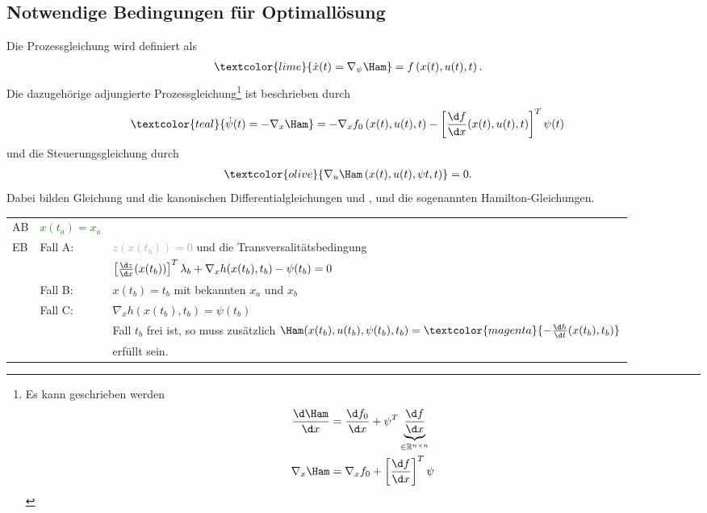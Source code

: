\subsection{Notwendige Bedingungen für Optimallösung}
Die Prozessgleichung wird definiert als
\begin{align}
	\textcolor{lime}{\dot{x}(t) = \nabla_{\psi}\Ham} & = f\left(x(t),u(t),t \right). \label{eqn:kap_2_prozessgleichung}
\end{align}
Die dazugehörige adjungierte Prozessgleichung\footnote{Es kann geschrieben werden \begin{align*}
\frac{\d\Ham}{\d x} & = \frac{\d f_0}{\d x}+\psi^T\underbrace{\frac{\d f}{\d x}}_{\in\mathbb{R}^{n\times n}}\\
\nabla_x\Ham & = \nabla_x f_0+\left[\frac{\d f}{\d x} \right]^T\psi
\end{align*}} ist beschrieben durch
\begin{align}
	\textcolor{teal}{\dot{\psi}(t) = -\nabla_x\Ham } & = -\nabla_x f_0\left(x(t),u(t),t \right)-\left[\frac{\d f}{\d x}(x(t),u(t),t) \right]^T\psi(t) \label{eqn:kap_2_adj_prozessglg}
\end{align}
und die Steuerungsgleichung durch
\begin{align}
	\textcolor{olive}{\nabla_u\Ham\left(x(t),u(t),\psi{t},t \right)} & = 0. \label{eqn:kap_2_steuergleichung}
\end{align}
Dabei bilden Gleichung  und  die kanonischen Differentialgleichungen und ,
 und  die sogenannten Hamilton-Gleichungen.\\
\begin{tabular}{lll}
\ac{AB} & \textcolor{green}{$x(t_a)=x_a$}\\
\ac{EB} & Fall A: 	& \textcolor{darkgray}{$z(x(t_b))=0$} und die Transversalitätsbedingung\\
		&			& \textcolor{cyan}{$\left[\frac{\d z}{\d x}(x(t_b)) \right]^T\lambda_b +\nabla_x
h(x(t_b),t_b)-\psi(t_b)=0$} \\
		& Fall B: 	& $x(t_b)=t_b$ mit bekannten $x_a$ und $x_b$\\
		& Fall C: 	& $\nabla_x h(x(t_b),t_b)=\psi(t_b)$\\
		&			& Fall $t_b$ frei ist, so muss zusätzlich $\Ham(x(t_b),u(t_b),\psi(t_b),t_b)=\textcolor{magenta}{-\frac{\d h}{\d t}(x(t_b),t_b)}$\\
		&			& erfüllt sein.
\end{tabular}


